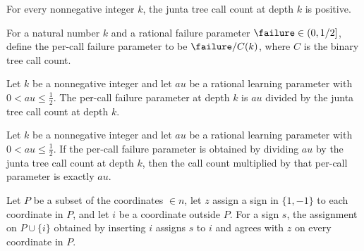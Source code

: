 \begin{theorem}
\label{FABL.juntaTreeCallCount_pos}
\leanok
{}
For every nonnegative integer $k$, the junta tree call count at depth $k$ is positive.
\end{theorem}

\begin{definition}
\label{FABL.juntaTreePerCallFailure}
\leanok
{}
For a natural number $k$ and a rational failure parameter $\failure\in(0,1/2]$, define
the per-call failure parameter to be $\failure/C(k)$, where $C$ is the binary tree call
count.
\end{definition}

\begin{theorem}
\label{FABL.juntaTreePerCallFailure_value}
\leanok
{}
Let $k$ be a nonnegative integer and let $	au$ be a rational learning parameter with
$0<	au\le\tfrac12$. The per-call failure parameter at depth $k$ is $	au$ divided by the
junta tree call count at depth $k$.
\end{theorem}

\begin{theorem}
\label{FABL.juntaTreeCallCount_mul_perCallFailure}
\leanok
{}
Let $k$ be a nonnegative integer and let $	au$ be a rational learning parameter with
$0<	au\le \tfrac12$. If the per-call failure parameter is obtained by dividing $	au$ by
the junta tree call count at depth $k$, then the call count multiplied by that per-call
parameter is exactly $	au$.
\end{theorem}

\begin{definition}
\label{FABL.insertJuntaFixedAssignment}
\leanok
{}
Let $P$ be a subset of the coordinates $\in n$, let $z$ assign a sign in $\{1,-1\}$ to
each coordinate in $P$, and let $i$ be a coordinate outside $P$. For a sign $s$, the
assignment on $P\cup\{i\}$ obtained by inserting $i$ assigns $s$ to $i$ and agrees with
$z$ on every coordinate in $P$.
\end{definition}

